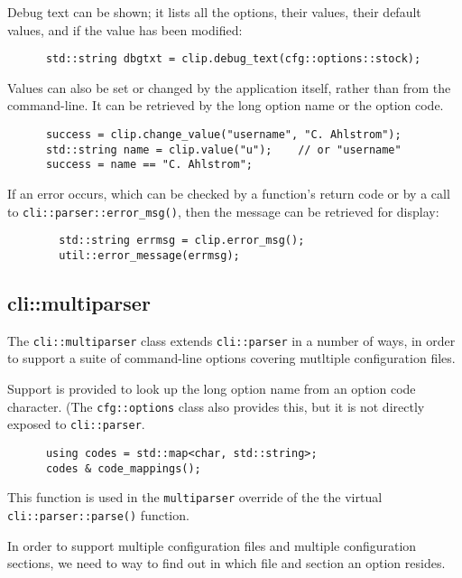    Debug text can be shown; it lists all the options, their values, their
   default values, and if the value has been modified:

   \begin{verbatim}
      std::string dbgtxt = clip.debug_text(cfg::options::stock);
   \end{verbatim}

   Values can also be set or changed by the application itself, rather
   than from the command-line. It can be retrieved by the long option
   name or the option code.

   \begin{verbatim}
      success = clip.change_value("username", "C. Ahlstrom");
      std::string name = clip.value("u");    // or "username"
      success = name == "C. Ahlstrom";
   \end{verbatim}

   If an error occurs, which can be checked by a function's return code
   or by a call to \texttt{cli::parser::error\_msg()}, then the message can
   be retrieved for display:

   \begin{verbatim}
        std::string errmsg = clip.error_msg();
        util::error_message(errmsg);
   \end{verbatim}

\subsection{cli::multiparser}
\label{subsec:cli_namespace_multiparser}

   The \texttt{cli::multiparser} class extends \texttt{cli::parser} in
   a number of ways, in order to support a suite of command-line options
   covering mutltiple configuration files.

   Support is provided to look up the long option name from an option code
   character. (The \texttt{cfg::options} class also provides this, but it
   is not directly exposed to \texttt{cli::parser}.

   \begin{verbatim}
      using codes = std::map<char, std::string>;
      codes & code_mappings();
   \end{verbatim}

   This function is used in the \texttt{multiparser} override of the
   the virtual \texttt{cli::parser::parse()} function.

   In order to support multiple configuration files and multiple
   configuration sections, we need to way to find out in which file and section
   an option resides.

